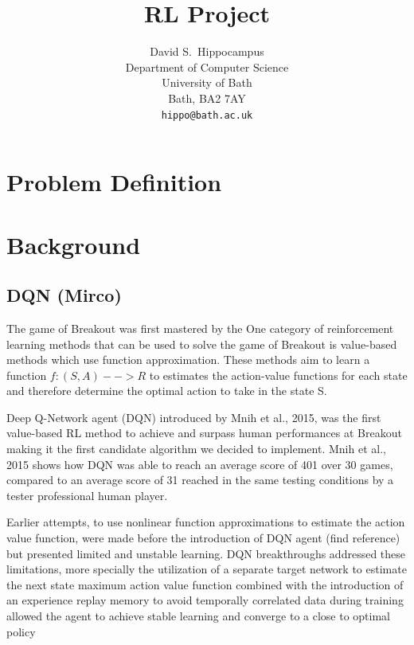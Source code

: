 \documentclass{article}
\title{RL Project}
\author{
  David S.~Hippocampus
  \\
  Department of Computer Science\\
  University of Bath\\
  Bath, BA2 7AY \\
  \texttt{hippo@bath.ac.uk} \\
}
\begin{document}
\maketitle

\section{Problem Definition}


\section{Background}


\subsection{DQN (Mirco)}
The game of Breakout was first mastered by the 
One category of reinforcement learning methods that can be used to solve the game of Breakout is value-based methods which use function approximation.
These methods aim to learn a function $f: (S,A) --> R $ to estimates the action-value functions for each state and therefore determine the optimal action to take in the state S.

Deep Q-Network agent (DQN) introduced by Mnih et al., 2015, was the first value-based RL method to achieve and surpass human performances at Breakout making it the first candidate algorithm we decided to implement.
Mnih et al., 2015 shows how DQN was able to reach an average score of 401 over 30 games, compared to an average score of 31 reached in the same testing conditions by a tester professional human player.

Earlier attempts, to use nonlinear function approximations to estimate the action value function, were made before the introduction of DQN agent (find reference) but presented limited and unstable learning.
DQN breakthroughs addressed these limitations, more specially the utilization of a separate target network to estimate the next state maximum action value function combined with the introduction of an experience replay memory to avoid temporally correlated data during training allowed the agent to achieve stable learning and converge to a close to optimal policy
\end{document}
